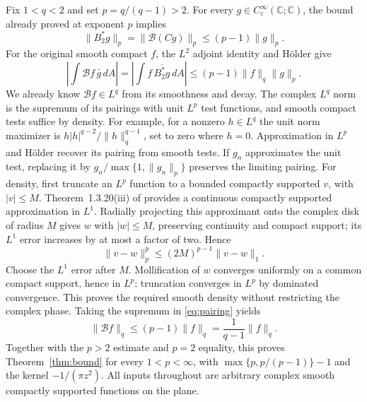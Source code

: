 \documentclass[11pt]{article}
\newcommand{\C}{\mathbb C}
\newcommand{\B}{\mathcal B}
\begin{document}
Fix \(1<q<2\) and set \(p=q/(q-1)>2\). For every
\(g\in C_c^\infty(\C;\C)\), the bound already proved at exponent \(p\)
implies
\[
 \|B_2^*g\|_p=\|\B(Cg)\|_p\le(p-1)\|g\|_p .
\]
For the original smooth compact \(f\), the \(L^2\) adjoint identity
and Hölder give
\begin{equation}\label{eq:pairing}
 \left|\int\B f\,\bar g\,dA\right|
 =\left|\int f\,\overline{B_2^*g}\,dA\right|
 \le(p-1)\|f\|_q\|g\|_p .
\end{equation}
We already know \(\B f\in L^q\) from its smoothness and decay.
The complex \(L^q\) norm is the supremum of its pairings with unit
\(L^p\) test functions, and smooth compact tests suffice by density.
For example, for a nonzero \(h\in L^q\) the unit norm maximizer is
\(h|h|^{q-2}/\|h\|_q^{q-1}\), set to zero where \(h=0\).
Approximation in \(L^p\) and Hölder recover its pairing from smooth tests.
If \(g_n\) approximates the unit test, replacing it by
\(g_n/\max\{1,\|g_n\|_p\}\) preserves the limiting pairing.
For density, first truncate an \(L^p\) function to a bounded compactly
supported \(v\), with \(|v|\le M\). Theorem~1.3.20(iii) of \cite{tao}
provides a continuous compactly supported approximation in \(L^1\).
Radially projecting this approximant onto the complex disk of radius \(M\)
gives \(w\) with \(|w|\le M\), preserving continuity and compact support;
its \(L^1\) error increases by at most a factor of two. Hence
\[
 \|v-w\|_p^p\le(2M)^{p-1}\|v-w\|_1.
\]
Choose the \(L^1\) error after \(M\). Mollification of \(w\) converges
uniformly on a common compact support, hence in \(L^p\); truncation
converges in \(L^p\) by dominated convergence. This proves the required
smooth density without restricting the complex phase.
Taking the supremum in \eqref{eq:pairing} yields
\[
 \|\B f\|_q\le(p-1)\|f\|_q
            =\frac1{q-1}\|f\|_q .
\]
Together with the \(p>2\) estimate and \(p=2\) equality, this proves
Theorem~\ref{thm:bound} for every \(1<p<\infty\), with
\(\max\{p,p/(p-1)\}-1\) and the kernel \(-1/(\pi z^2)\).
All inputs throughout are arbitrary complex smooth compactly supported
functions on the plane.
\end{document}
